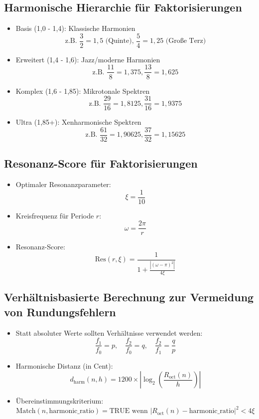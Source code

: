 \documentclass[12pt,a4paper]{article}
\begin{document}
	\subsection{Harmonische Hierarchie f\"{u}r Faktorisierungen}
	\begin{itemize}
		\item Basis (1,0 - 1,4): Klassische Harmonien
		$$\text{z.B. } \frac{3}{2} = 1,5 \text{ (Quinte), } \frac{5}{4} = 1,25 \text{ (Gro\ss{}e Terz)}$$
		
		\item Erweitert (1,4 - 1,6): Jazz/moderne Harmonien
		$$\text{z.B. } \frac{11}{8} = 1,375, \frac{13}{8} = 1,625$$
		
		\item Komplex (1,6 - 1,85): Mikrotonale Spektren
		$$\text{z.B. } \frac{29}{16} = 1,8125, \frac{31}{16} = 1,9375$$
		
		\item Ultra (1,85+): Xenharmonische Spektren
		$$\text{z.B. } \frac{61}{32} = 1,90625, \frac{37}{32} = 1,15625$$
	\end{itemize}
	
	\subsection{Resonanz-Score f\"{u}r Faktorisierungen}
	\begin{itemize}
		\item Optimaler Resonanzparameter:
		$$\xi = \frac{1}{10}$$
		
		\item Kreisfrequenz f\"{u}r Periode $r$:
		$$\omega = \frac{2\pi}{r}$$
		
		\item Resonanz-Score:
		$$\text{Res}(r,\xi) = \frac{1}{1 + \frac{|(\omega-\pi)^2|}{4\xi}}$$
	\end{itemize}
	
	\subsection{Verh\"{a}ltnisbasierte Berechnung zur Vermeidung von Rundungsfehlern}
	\begin{itemize}
		\item Statt absoluter Werte sollten Verh\"{a}ltnisse verwendet werden:
		$$\frac{f_1}{f_0} = p, \quad \frac{f_2}{f_0} = q, \quad \frac{f_2}{f_1} = \frac{q}{p}$$
		
		\item Harmonische Distanz (in Cent):
		$$d_{\text{harm}}(n,h) = 1200 \times \left|\log_2\left(\frac{R_{\text{oct}}(n)}{h}\right)\right|$$
		
		\item \"{U}bereinstimmungskriterium:
		$$\text{Match}(n, \text{harmonic\_ratio}) = \text{TRUE wenn } |R_{\text{oct}}(n) - \text{harmonic\_ratio}|^2 < 4\xi$$
	\end{itemize}
	
\end{document}
